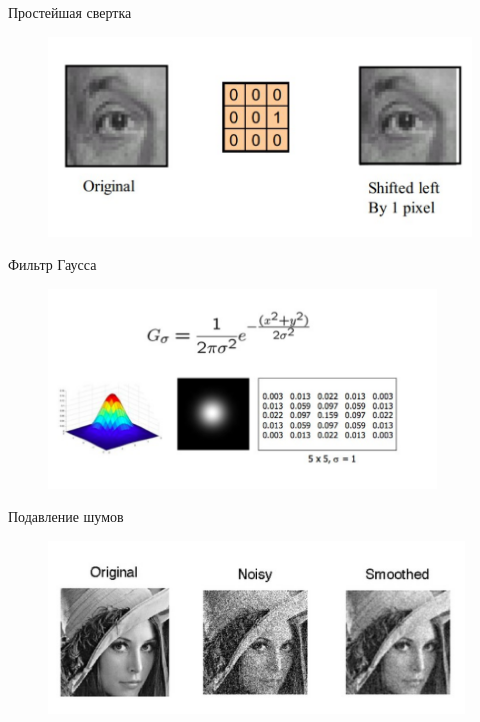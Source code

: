 \documentclass[10pt]{beamer}
\begin{document}
\begin{frame}{Простейшая свертка}
	\begin{figure}[htbp]
	  \includegraphics[height=150pt, keepaspectratio = true]{images/conv_easy4}   
	\end{figure}
\end{frame}

\begin{frame}{Фильтр Гаусса}
 \begin{figure}[htbp]
	  \includegraphics[height=150pt, keepaspectratio = true]{images/gauss}   
	\end{figure}
\end{frame}

\begin{frame}{Подавление шумов}
	\begin{figure}[htbp]
	  \includegraphics[height=130pt, keepaspectratio = true]{images/gauss2}   
	\end{figure}
\end{frame}
\end{document}
